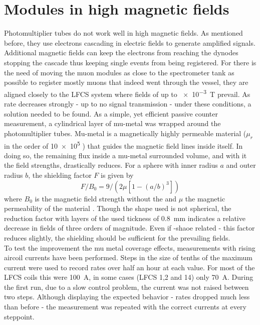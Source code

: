   \section{Modules in high magnetic fields}
  \label{ch:Analysis:sec:Modules in high magnetic fields}
  Photomultiplier tubes do not work well in high magnetic fields. As mentioned before, they use electrons cascading in electric fields to generate amplified signals. Additional magnetic fields can keep the electrons from reaching the dynodes stopping the cascade thus keeping single events from being registered. 
  For there is the need of moving the muon modules as close to the spectrometer tank as possible to register mostly muons that indeed went through the vessel, they are aligned closely to the LFCS system where fields of up to \SI{e-3}{\tesla} prevail. As rate decreases strongly - up to no signal transmission \cite{nancy} - under these conditions, a solution needed to be found. As a simple, yet efficient passive counter measurement, a cylindrical layer of mu-metal was wrapped around the photomultiplier tubes. Mu-metal is a magnetically highly permeable material ($\mu_r$ in the order of \SI{10e5}{} \cite{permeability}) that guides the magnetic field lines inside itself. In doing so, the remaining flux inside a mu-metal surrounded volume, and with it the field strengths, drastically reduces.
  For a sphere with inner radius $a$ and outer radius $b$, the shielding factor $ F$ is given by
  \begin{equation}
  	F/B_0 = 9/\left(2\mu\left[1-(a/b)^3\right]\right)
  \end{equation}
  where $B_0$ is the magnetic field strength without the and $\mu$ the magnetic permeability of the material \cite{shielding}. Though the shape used is not spherical, the reduction factor with layers of the used tickness of \SI{0.8}{\mm} indicates a relative decrease in fields of three orders of magnitude. Even if -shaoe related - this factor reduces slightly, the shielding should be sufficient for the prevailing fields.\\
  To test the improvement the mu metal coverage effects, measurements with rising aircoil currents have been performed.
  Steps in the size of tenths of the maximum current were used to record rates over half an hour at each value. For most of the LFCS coils this were \SI{100}{\ampere}, in some cases (LFCS 1,2 and 14) only \SI{70}{\ampere}.
  During the first run, due to a slow control problem, the current was not raised between two steps. Although displaying the expected behavior - rates dropped much less than before - the measurement was repeated with the correct currents at every steppoint.
